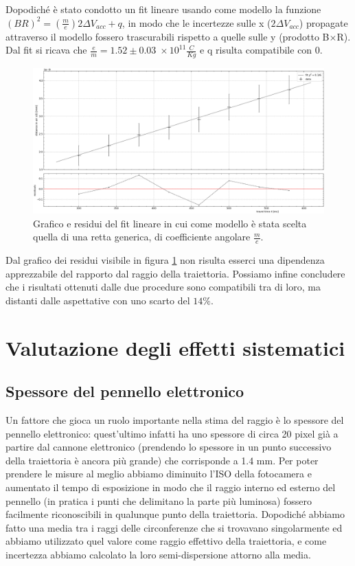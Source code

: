 \documentclass[10pt, a4paper, italian]{article}
\begin{document}
Dopodiché è stato condotto un fit lineare usando come modello la funzione $(BR)^2 = (\frac{m}{e})2\Delta V_{acc} +q$, in modo che le incertezze sulle x ($2\Delta V_{acc}$) propagate attraverso il modello fossero trascurabili rispetto a quelle sulle y (prodotto B$\times$R). Dal fit si ricava che $\frac{e}{m}=1.52 \pm 0.03 \; \times 10^{11} \frac{C}{Kg}$ e q risulta compatibile con 0.
\begin{figure}
\includegraphics[width=\textwidth]{linfit}
\caption{\label{fig:linfit}Grafico e residui del fit lineare in cui come modello è stata scelta quella di una retta generica, di coefficiente angolare $\frac{m}{e}$.}
\end{figure}
Dal grafico dei residui visibile in figura \ref{fig:linfit} non risulta esserci una dipendenza apprezzabile del rapporto dal raggio della traiettoria.
Possiamo infine concludere che i risultati ottenuti dalle due procedure sono compatibili tra di loro, ma distanti dalle aspettative con uno scarto del $14 \percent$.

\section{Valutazione degli effetti sistematici}

\subsection{Spessore del pennello elettronico}
Un fattore che gioca un ruolo importante nella stima del raggio è lo spessore del pennello elettronico: quest'ultimo infatti ha uno spessore di circa 20 pixel già a partire dal cannone elettronico (prendendo lo spessore in un punto successivo della traiettoria è ancora più grande) che corrisponde a 1.4 mm. Per poter prendere le misure al meglio abbiamo diminuito l'ISO della fotocamera e aumentato il tempo di esposizione in modo che il raggio interno ed esterno del pennello (in pratica i punti che delimitano la parte più luminosa) fossero facilmente riconoscibili in qualunque punto della traiettoria. Dopodiché abbiamo fatto una media tra i raggi delle circonferenze che si trovavano singolarmente ed abbiamo utilizzato quel valore come raggio effettivo della traiettoria, e come incertezza abbiamo calcolato la loro semi-dispersione attorno alla media.
\end{document}
